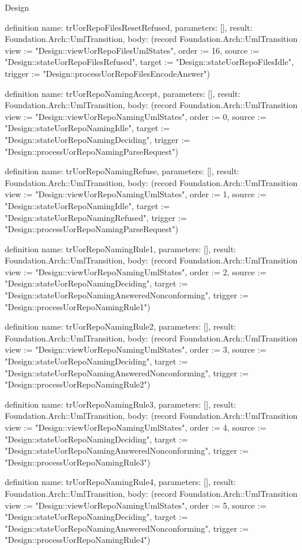 \begin{lexlean}{Design}
\begin{semanticmodule}
definition{
  name: trUorRepoFilesResetRefused,
  parameters: [],
  result: Foundation.Arch::UmlTransition,
  body: (record Foundation.Arch::UmlTransition {view := "Design::viewUorRepoFilesUmlStates", order := 16, source := "Design::stateUorRepoFilesRefused", target := "Design::stateUorRepoFilesIdle", trigger := "Design::processUorRepoFilesEncodeAnswer"})
}

definition{
  name: trUorRepoNamingAccept,
  parameters: [],
  result: Foundation.Arch::UmlTransition,
  body: (record Foundation.Arch::UmlTransition {view := "Design::viewUorRepoNamingUmlStates", order := 0, source := "Design::stateUorRepoNamingIdle", target := "Design::stateUorRepoNamingDeciding", trigger := "Design::processUorRepoNamingParseRequest"})
}

definition{
  name: trUorRepoNamingRefuse,
  parameters: [],
  result: Foundation.Arch::UmlTransition,
  body: (record Foundation.Arch::UmlTransition {view := "Design::viewUorRepoNamingUmlStates", order := 1, source := "Design::stateUorRepoNamingIdle", target := "Design::stateUorRepoNamingRefused", trigger := "Design::processUorRepoNamingParseRequest"})
}

definition{
  name: trUorRepoNamingRule1,
  parameters: [],
  result: Foundation.Arch::UmlTransition,
  body: (record Foundation.Arch::UmlTransition {view := "Design::viewUorRepoNamingUmlStates", order := 2, source := "Design::stateUorRepoNamingDeciding", target := "Design::stateUorRepoNamingAnsweredNonconforming", trigger := "Design::processUorRepoNamingRule1"})
}

definition{
  name: trUorRepoNamingRule2,
  parameters: [],
  result: Foundation.Arch::UmlTransition,
  body: (record Foundation.Arch::UmlTransition {view := "Design::viewUorRepoNamingUmlStates", order := 3, source := "Design::stateUorRepoNamingDeciding", target := "Design::stateUorRepoNamingAnsweredNonconforming", trigger := "Design::processUorRepoNamingRule2"})
}

definition{
  name: trUorRepoNamingRule3,
  parameters: [],
  result: Foundation.Arch::UmlTransition,
  body: (record Foundation.Arch::UmlTransition {view := "Design::viewUorRepoNamingUmlStates", order := 4, source := "Design::stateUorRepoNamingDeciding", target := "Design::stateUorRepoNamingAnsweredNonconforming", trigger := "Design::processUorRepoNamingRule3"})
}

definition{
  name: trUorRepoNamingRule4,
  parameters: [],
  result: Foundation.Arch::UmlTransition,
  body: (record Foundation.Arch::UmlTransition {view := "Design::viewUorRepoNamingUmlStates", order := 5, source := "Design::stateUorRepoNamingDeciding", target := "Design::stateUorRepoNamingAnsweredNonconforming", trigger := "Design::processUorRepoNamingRule4"})
}


\end{semanticmodule}
\end{lexlean}
